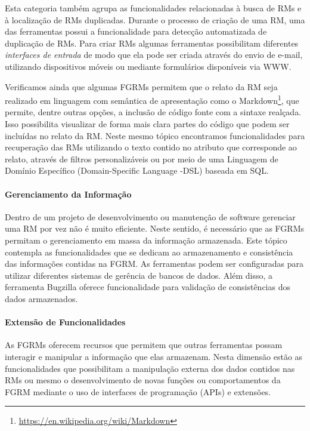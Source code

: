 Esta categoria também agrupa as funcionalidades relacionadas à busca de RMs e à
localização de RMs duplicadas. Durante o processo de criação de uma RM, uma das
ferramentas possui a funcionalidade para detecção automatizada de duplicação de
RMs. Para criar RMs algumas ferramentas possibilitam diferentes
\textit{interfaces de entrada} de modo que ela pode ser criada através do envio
de e-mail, utilizando dispositivos móveis ou mediante formulários disponíveis
via WWW\@.

Verificamos ainda que algumas FGRMs permitem que o relato da RM seja realizado
em linguagem com semântica de apresentação como o
Markdown\footnote{\url{https://en.wikipedia.org/wiki/Markdown}}, que permite,
dentre outras opções, a inclusão de código fonte com a sintaxe realçada. Isso
possibilita visualizar de forma mais clara partes do código que podem ser
incluídas no relato da RM\@. Neste mesmo tópico encontramos funcionalidades para
recuperação das RMs utilizando o texto contido no atributo que corresponde ao
relato, através de filtros personalizáveis ou por meio de uma Linguagem de
Domínio Específico (Domain-Specific Language \@-\@ DSL) baseada em SQL\@.

\paragraph{Gerenciamento da Informação}
\label{par:gerenciamento_da_informação}

Dentro de um projeto de desenvolvimento ou manutenção de software gerenciar uma
RM por vez não é muito eficiente. Neste sentido, é necessário que as FGRMs
permitam o gerenciamento em massa da informação armazenada. Este tópico
contempla as funcionalidades que se dedicam ao armazenamento e consistência das
informações contidas na FGRM\@. As ferramentas podem ser configuradas para
utilizar diferentes sistemas de gerência de bancos de dados. Além disso, a
ferramenta Bugzilla oferece funcionalidade para validação de consistências dos
dados armazenados.

\paragraph{Extensão de Funcionalidades}
\label{par:extensão_de_funcionalidades}

As FGRMs oferecem recursos que permitem que outras ferramentas possam interagir
e manipular a informação que elas armazenam. Nesta dimensão estão as
funcionalidades que possibilitam a manipulação externa dos dados contidos nas
RMs ou mesmo o desenvolvimento de novas funções ou comportamentos da FGRM
mediante o uso de interfaces de programação (APIs) e extensões.

